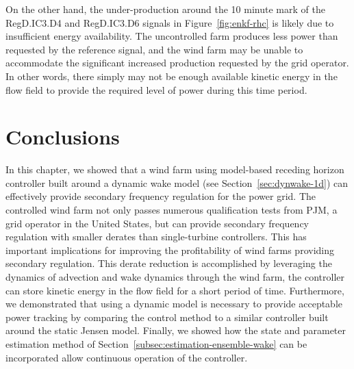 On the other hand, the under-production around the 10 minute mark of the RegD.IC3.D4 and RegD.IC3.D6 signals in Figure~\ref{fig:enkf-rhc} is likely due to insufficient energy availability. The uncontrolled farm produces less power than requested by the reference signal, and the wind farm may be unable to accommodate the significant increased production requested by the grid operator. In other words, there simply may not be enough available kinetic energy in the flow field to provide the required level of power during this time period.

\section{Conclusions}
In this chapter, we showed that a wind farm using model-based receding horizon controller built around a dynamic wake model (see Section~\ref{sec:dynwake-1d}) can effectively provide secondary frequency regulation for the power grid. The controlled wind farm not only passes numerous qualification tests from PJM, a grid operator in the United States, but can provide secondary frequency regulation with smaller derates than single-turbine controllers. This has important implications for improving the profitability of wind farms providing secondary regulation. This derate reduction is accomplished by leveraging the dynamics of advection and wake dynamics through the wind farm, the controller can store kinetic energy in the flow field for a short period of time. Furthermore, we demonstrated that using a dynamic model is necessary to provide acceptable power tracking by comparing the control method to a similar controller built around the static Jensen model. Finally, we showed how the state and parameter estimation method of Section~\ref{subsec:estimation-ensemble-wake} can be incorporated allow continuous operation of the controller.